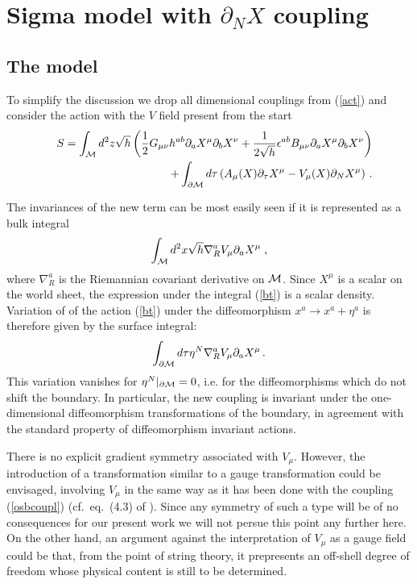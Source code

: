 \documentclass[a4paper,12pt]{article}
\newcommand{\oB}{|_{\partial{\cal M}}}
\begin{document}
\section{Sigma model with $\partial_N X$ coupling}
\subsection{The model}
To simplify the discussion we drop all dimensional
couplings from (\ref{act}) and consider the  action
with the $V$ field present from the start
\begin{eqnarray}
&&S= \int _{\cal M}d^{2}z\sqrt{h}
\left(\frac{1}{2} G_{\mu\nu} h^{ab}
\partial _{a}X^{\mu }\partial _{b}X^{\nu }
+\frac{1}{2\sqrt{h}}\epsilon^{ab}B_{\mu\nu}
\partial _{a}X^{\mu }\partial _{b}X^{\nu } \right)
\nonumber \\
&&\qquad+\int _{\partial {\cal M}}d\tau \left(
 A_{\mu }(X)\partial _{\tau }X^\mu
 -V_{\mu}(X)\partial _{N}X^\mu
\right) \, .
\label{actnew}
\end{eqnarray}

The invariances of the new term can be most easily seen if 
it is represented as a bulk integral
\begin{equation}
\int_{\cal M} d^2 x\sqrt{h} \nabla_R^a V_\mu\partial_a 
X^\mu\; ,
\label{bt}
\end{equation}
where $\nabla_R^a$ is the Riemannian covariant derivative on
${\cal M}$. Since $X^\mu$ is a scalar on the world sheet, the
expression under the integral (\ref{bt}) is a scalar density.
Variation of of the action (\ref{bt}) under the diffeomorphism
$x^a\to x^a +\eta^a$ is therefore given by the surface integral:
\begin{equation}
\int_{\partial {\cal M}} d\tau \eta^N 
\nabla_R^a V_\mu\partial_a X^\mu \,.\label{varbt}
\end{equation}
This variation vanishes for $\eta^N\oB =0$, i.e. for the
diffeomorphisms which do not shift the boundary. In particular,
the new coupling is invariant under the one-dimensional
diffeomorphism transformations of the boundary, in agreement 
with the standard property of diffeomorphism invariant actions. 

There is no explicit gradient symmetry associated with $V_\mu$.
However, the introduction of a transformation similar to 
a gauge transformation could be envisaged, 
involving $V_\mu$ in the same way as it has been done with
the coupling (\ref{osbcoupl}) (cf.\ eq.\ (4.3) of \cite{Osborn91}).
Since any symmetry of such a type will be of no consequences 
for our present work we will not persue this point any 
further here. On the other hand, an argument against the interpretation of 
$V_\mu$ as a gauge field could be that, from the point of 
string theory, it prepresents an off-shell degree of freedom 
whose physical content is still to be determined. 
\end{document}
